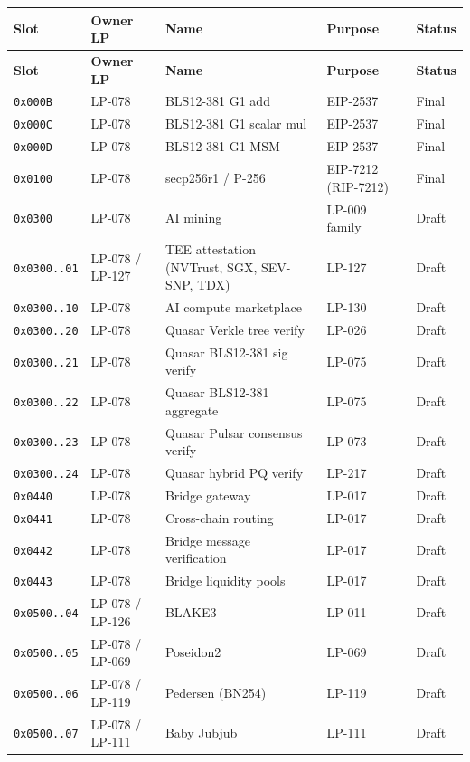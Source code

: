 \begin{longtable}{@{}p{2.0cm}p{2.4cm}p{4.2cm}p{3.0cm}p{1.2cm}@{}}
\toprule
\textbf{Slot} & \textbf{Owner LP} & \textbf{Name} & \textbf{Purpose} & \textbf{Status} \\
\midrule
\endfirsthead
\toprule
\textbf{Slot} & \textbf{Owner LP} & \textbf{Name} & \textbf{Purpose} & \textbf{Status} \\
\midrule
\endhead
\texttt{0x000B} & LP-078 & BLS12-381 G1 add & EIP-2537 & Final \\
\texttt{0x000C} & LP-078 & BLS12-381 G1 scalar mul & EIP-2537 & Final \\
\texttt{0x000D} & LP-078 & BLS12-381 G1 MSM & EIP-2537 & Final \\
\texttt{0x0100} & LP-078 & secp256r1 / P-256 & EIP-7212 (RIP-7212) & Final \\
\texttt{0x0300} & LP-078 & AI mining & LP-009 family & Draft \\
\texttt{0x0300..01} & LP-078 / LP-127 & TEE attestation (NVTrust, SGX, SEV-SNP, TDX) & LP-127 & Draft \\
\texttt{0x0300..10} & LP-078 & AI compute marketplace & LP-130 & Draft \\
\texttt{0x0300..20} & LP-078 & Quasar Verkle tree verify & LP-026 & Draft \\
\texttt{0x0300..21} & LP-078 & Quasar BLS12-381 sig verify & LP-075 & Draft \\
\texttt{0x0300..22} & LP-078 & Quasar BLS12-381 aggregate & LP-075 & Draft \\
\texttt{0x0300..23} & LP-078 & Quasar Pulsar consensus verify & LP-073 & Draft \\
\texttt{0x0300..24} & LP-078 & Quasar hybrid PQ verify & LP-217 & Draft \\
\texttt{0x0440} & LP-078 & Bridge gateway & LP-017 & Draft \\
\texttt{0x0441} & LP-078 & Cross-chain routing & LP-017 & Draft \\
\texttt{0x0442} & LP-078 & Bridge message verification & LP-017 & Draft \\
\texttt{0x0443} & LP-078 & Bridge liquidity pools & LP-017 & Draft \\
\texttt{0x0500..04} & LP-078 / LP-126 & BLAKE3 & LP-011 & Draft \\
\texttt{0x0500..05} & LP-078 / LP-069 & Poseidon2 & LP-069 & Draft \\
\texttt{0x0500..06} & LP-078 / LP-119 & Pedersen (BN254) & LP-119 & Draft \\
\texttt{0x0500..07} & LP-078 / LP-111 & Baby Jubjub & LP-111 & Draft \\

\end{longtable}
